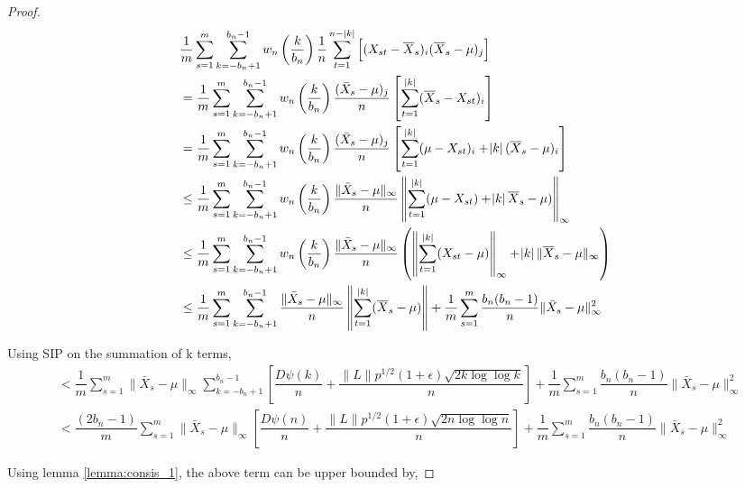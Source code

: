 \documentclass[12pt]{article}
\begin{document}
\begin{proof}
\begin{align*}
    & \dfrac{1}{m}\sum\limits_{s=1}^{m}\sum\limits_{k=-b_n+1}^{b_n-1}w_n\left(\dfrac{k}{b_n}\right)\dfrac{1}{n}\sum\limits_{t=1}^{n-|k|}\left[(X_{st} - \overline{X}_s)_i(\overline{X}_s - \mu)_j \right]\\
    & = \dfrac{1}{m}\sum\limits_{s=1}^{m}\sum\limits_{k=-b_n+1}^{b_n-1}w_n\left(\dfrac{k}{b_n}\right)\dfrac{(\bar{X}_s - \mu)_j}{n}\left[\sum\limits_{t=1}^{|k|}(\overline{X}_s - X_{st})_i\right]\\
    & = \dfrac{1}{m}\sum\limits_{s=1}^{m}\sum\limits_{k=-b_n+1}^{b_n-1}w_n\left(\dfrac{k}{b_n}\right)\dfrac{(\bar{X}_s - \mu)_j}{n}\left[\sum\limits_{t=1}^{|k|}(\mu - X_{st})_i + \abs{k}(\overline{X}_s - \mu)_i\right]\\
    & \leq \dfrac{1}{m}\sum\limits_{s=1}^{m}\sum\limits_{k=-b_n+1}^{b_n-1}w_n\left(\dfrac{k}{b_n}\right)\dfrac{\|\bar{X}_s - \mu\|_{\infty}}{n}\left\|\sum\limits_{t=1}^{|k|}(\mu - X_{st}) + \abs{k}\overline{X}_s - \mu)\right\|_{\infty}\\
    & \leq \dfrac{1}{m}\sum\limits_{s=1}^{m}\sum\limits_{k=-b_n+1}^{b_n-1}w_n\left(\dfrac{k}{b_n}\right)\dfrac{\|\bar{X}_s - \mu\|_{\infty}}{n}\left(\left\|\sum\limits_{t=1}^{|k|}(X_{st} - \mu)\right\|_{\infty} + \abs{k}\|\overline{X}_s - \mu\|_{\infty} \right)\\
    & \leq \dfrac{1}{m}\sum\limits_{s=1}^{m}\sum\limits_{k=-b_n+1}^{b_n-1}\dfrac{\|\bar{X}_s - \mu\|_{\infty}}{n}\left\|\sum\limits_{t=1}^{|k|}(\overline{X}_s - \mu)\right\| + \dfrac{1}{m}\sum\limits_{s=1}^{m} \dfrac{b_n(b_n-1)}{n}\|\bar{X}_s - \mu\|_{\infty}^2
\end{align*}

Using SIP on the summation of k terms,
\begin{multline*}
    & < \dfrac{1}{m}\sum\limits_{s=1}^{m}\|\bar{X}_s - \mu\|_{\infty}\sum\limits_{k=-b_n + 1}^{b_n-1}\left[ \dfrac{D \psi(k)}{n} + \dfrac{\|L\| p^{1/2}(1+\epsilon)\sqrt{2k \log\log k}}{n}  \right] + \dfrac{1}{m}\sum\limits_{s=1}^{m} \dfrac{b_n(b_n-1)}{n}\|\bar{X}_s - \mu\|_{\infty}^2\\
    & < \dfrac{(2b_n-1)}{m}\sum\limits_{s=1}^{m}\|\bar{X}_s - \mu\|_{\infty}\left[ \dfrac{D \psi(n)}{n} + \dfrac{\|L\| p^{1/2}(1+\epsilon)\sqrt{2n \log\log n}}{n}  \right] + \dfrac{1}{m}\sum\limits_{s=1}^{m} \dfrac{b_n(b_n-1)}{n}\|\bar{X}_s - \mu\|_{\infty}^2
\end{multline*}

Using lemma \ref{lemma:consis_1}, the above term can be upper bounded by,


\end{proof}
\end{document}
